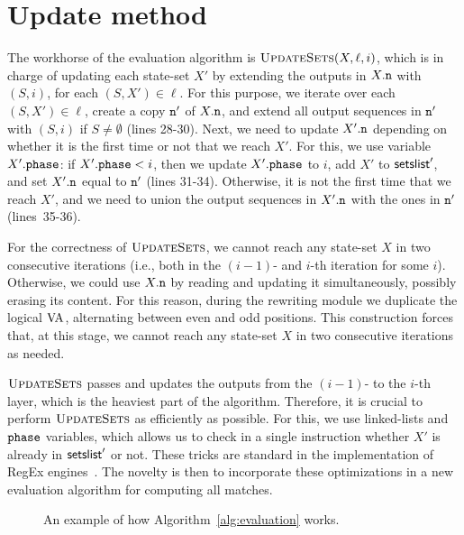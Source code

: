 \section{Update method} 
The workhorse of the evaluation algorithm is $\textproc{UpdateSets}(X, \ell,i)$,
which is in charge of updating each state-set $X'$ by extending the outputs in
$X.\mathtt{n}$ with $(S,i)$, for each $(S, X') \in \!\ell$. For this purpose, we
iterate over each $(S, X') \in \ell$, create a copy $\mathtt{n}'$ of $X.\mathtt{n}$, and
extend all output sequences in $\mathtt{n}'$ with $(S,i)$ if $S\neq \emptyset$ (lines
28-30). Next, we need to update $X'.\mathtt{n}$ depending on whether it is the first
time or not that we reach $X'$. For this, we use variable $X'.\texttt{phase}$: if
$X'.\texttt{phase} < i$, then we update $X'.\texttt{phase}$ to $i$, add $X'$ to
$\textsf{setslist}'$, and set $X'.\mathtt{n}$ equal to $\mathtt{n}'$ (lines 31-34). Otherwise,
it is not the first time that we reach $X'$, and we need to union the output
sequences in $X'.\mathtt{n}$ with the ones in $\mathtt{n}'$ (lines~35-36).

For the correctness of $\textproc{UpdateSets}$, we cannot reach any state-set
$X$ in two consecutive iterations (i.e., both in the $(i-1)$- and $i$-th
iteration for some $i$). Otherwise, we could use $X.\mathtt{n}$ by reading and
updating it simultaneously, possibly erasing its content. For this reason,
during the rewriting module we duplicate the logical $\mathrm{VA}$, alternating between
even and odd positions. This construction forces that, at this stage, we cannot
reach any state-set $X$ in two consecutive iterations as needed.


$\textproc{UpdateSets}$ passes and updates the outputs from the $(i-1)$- to the
$i$-th layer, which is the heaviest part of the algorithm. Therefore, it is
crucial to perform $\textproc{UpdateSets}$ as efficiently as possible. For this,
we use linked-lists and $\texttt{phase}$ variables, which allows us to check in a single
instruction whether $X'$ is already in $\textsf{setslist}'$ or not. These tricks are
standard in the implementation of RegEx engines~\citep{cox2007regular}. The
novelty is then to incorporate these optimizations in a new evaluation algorithm
for computing all matches.

\begin{figure}
	\centering
	
	\caption{An example of how Algorithm~\ref{alg:evaluation} works.}
	\label{fig:algo-run}
\end{figure}

